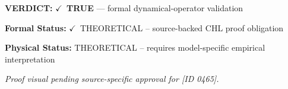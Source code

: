 \textbf{VERDICT:} \ensuremath{\checkmark}\ \textbf{TRUE} --- formal dynamical-operator validation

\textbf{Formal Status:} \ensuremath{\checkmark}\ THEORETICAL -- source-backed CHL proof obligation

\textbf{Physical Status:} THEORETICAL -- requires model-specific empirical interpretation
\par\vspace{0.45em}
\par
\vfill
\begingroup\footnotesize\itshape
Proof visual pending source-specific approval for [ID 0465].
\par\endgroup
\vfill
\endgroup
\endgroup

